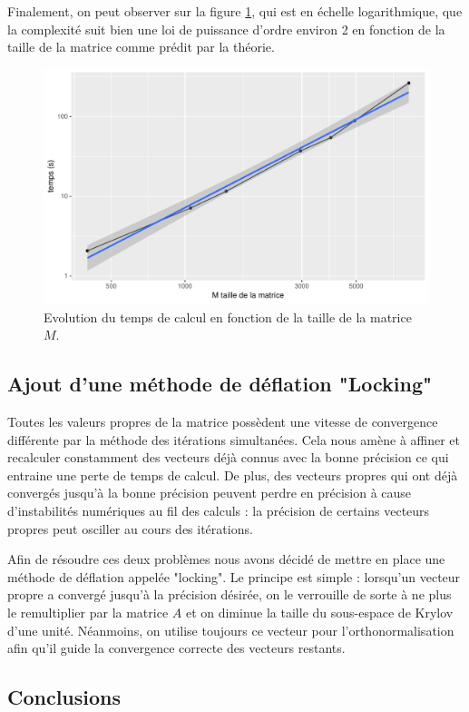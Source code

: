 \documentclass[11pt,a4paper]{article}
\begin{document}
		Finalement, on peut observer sur la figure \ref{fig:tvsM}, qui est en échelle logarithmique, que la complexité suit bien une loi de puissance d'ordre environ 2 en fonction de la taille de la matrice comme prédit par la théorie.
		\begin{figure}
			\centering
			\includegraphics[width = 0.7\linewidth]{plots/tvsM.pdf}
			\caption{Evolution du temps de calcul en fonction de la taille de la matrice $M$. \label{fig:tvsM}}
		\end{figure}



	\subsection{Ajout d'une méthode de déflation "Locking"}
		Toutes les valeurs propres de la matrice possèdent une vitesse de convergence différente par la méthode des itérations simultanées. Cela nous amène à affiner et recalculer constamment des vecteurs déjà connus avec la bonne précision ce qui entraine une perte de temps de calcul. De plus, des vecteurs propres qui ont déjà convergés jusqu'à la bonne précision peuvent perdre en précision à cause d'instabilités numériques au fil des calculs : la précision de certains vecteurs propres peut osciller au cours des itérations.

		Afin de résoudre ces deux problèmes nous avons décidé de mettre en place une méthode de déflation appelée "locking". Le principe est simple : lorsqu'un vecteur propre a convergé jusqu'à la précision désirée, on le verrouille de sorte à ne plus le remultiplier par la matrice $A$ et on diminue la taille du sous-espace de Krylov d'une unité. Néanmoins, on utilise toujours ce vecteur pour l'orthonormalisation afin qu'il guide la convergence correcte des vecteurs restants.

	\subsection{Conclusions}
\end{document}

